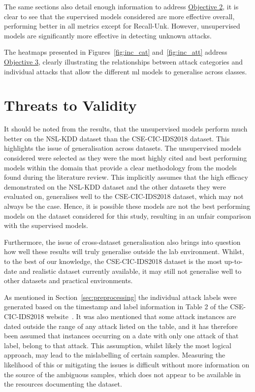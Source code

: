 The same sections also detail enough information to address
\hyperlink{obj}{Objective 2}, it is clear to see that the supervised models
considered are more effective overall, performing better in all metrics except
for Recall-Unk. However, unsupervised models are significantly more effective
in detecting unknown attacks.

The heatmaps presented in Figures~\ref{fig:inc_cat} and~\ref{fig:inc_att}
address \hyperlink{obj}{Objective 3}, clearly illustrating the relationships
between attack categories and individual attacks that allow the different
\gls{ml} models to generalise across classes.

\section{Threats to Validity}%
\label{sec:threats}
It should be noted from the results, that the unsupervised models perform much
better on the NSL-KDD dataset than the CSE-CIC-IDS2018 dataset. This highlights
the issue of generalisation across datasets. The unsupervised models considered
were selected as they were the most highly cited and best performing models
within the domain that provide a clear methodology from the models found during
the literature review. This implicitly assumes that the high efficacy
demonstrated on the NSL-KDD dataset and the other datasets they were evaluated
on, generalises well to the CSE-CIC-IDS2018 dataset, which may not always be
the case. Hence, it is possible these models are not the best performing models
on the dataset considered for this study, resulting in an unfair comparison
with the supervised models.

Furthermore, the issue of cross-dataset generalisation also brings into
question how well these results will truly generalise outside the lab
environment. Whilst, to the best of our knowledge, the CSE-CIC-IDS2018 dataset
is the most up-to-date and realistic dataset currently available, it may still
not generalise well to other datasets and practical environments.

As mentioned in Section~\ref{sec:preprocessing} the individual attack labels
were generated based on the timestamp and label information in Table 2 of the
CSE-CIC-IDS2018 website~\cite{cic2018}. It was also mentioned that some attack
instances are dated outside the range of any attack listed on the table, and it
has therefore been assumed that instances occurring on a date with only one
attack of that label, belong to that attack. This assumption, whilst likely the
most logical approach, may lead to the mislabelling of certain samples.
Measuring the likelihood of this or mitigating the issues is difficult without
more information on the source of the ambiguous samples, which does not appear
to be available in the resources documenting the dataset.

